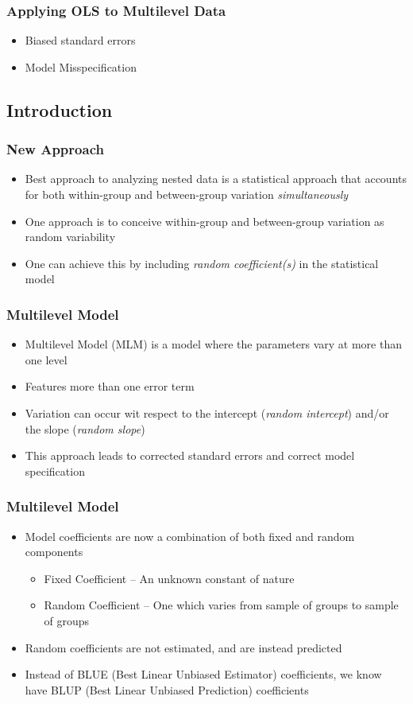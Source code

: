 \documentclass{beamer}
\begin{document}
\begin{frame}
	\frametitle{Applying OLS to Multilevel Data}
		\begin{itemize}
			\item Biased standard errors
			\item Model Misspecification
		\end{itemize}
\end{frame}

\subsection{Introduction}

\begin{frame}
	\frametitle{New Approach}
		\begin{itemize}
			\item Best approach to analyzing nested data is a statistical approach that accounts for both within-group and between-group variation \textit{simultaneously}
			\item One approach is to conceive within-group and between-group variation as random variability
			\item One can achieve this by including \textit{random coefficient(s)} in the statistical model
		\end{itemize}
\end{frame}

\begin{frame}
	\frametitle{Multilevel Model}
		\begin{itemize}
			\item Multilevel Model (MLM) is a model where the parameters vary at more than one level
			\item Features more than one error term
			\item Variation can occur wit respect to the intercept (\textit{random intercept}) and/or the slope (\textit{random slope})
			\item This approach leads to corrected standard errors and correct model specification
		\end{itemize}
\end{frame}

\begin{frame}
	\frametitle{Multilevel Model}
		\begin{itemize}
			\item Model coefficients are now a combination of both fixed and random components
				\begin{itemize}
					\item Fixed Coefficient -- An unknown constant of nature
					\item Random Coefficient -- One which varies from sample of groups to sample of groups
				\end{itemize}
			\item Random coefficients are not estimated, and are instead predicted
			\item Instead of BLUE (Best Linear Unbiased Estimator)  coefficients, we know have BLUP (Best Linear Unbiased Prediction) coefficients
		\end{itemize}
\end{frame}
\end{document}
